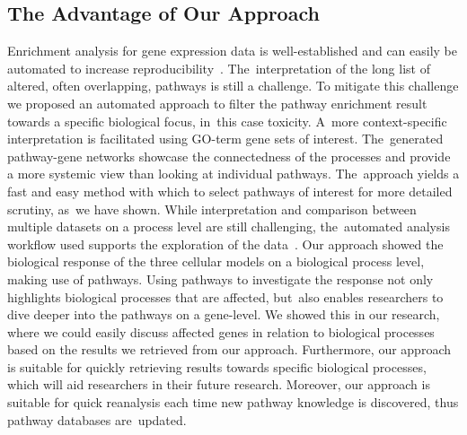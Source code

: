 \documentclass[ijms,article,accept,moreauthors,pdftex]{Definitions/mdpi}
\begin{document}
\begin{paracol}{2}
\subsection{The Advantage of Our Approach}
Enrichment analysis for gene expression data is well-established and can easily be automated to increase reproducibility~\cite{Yu2012}. The~interpretation of the long list of altered, often overlapping, pathways is still a challenge. {To mitigate this challenge we proposed} an automated approach to filter the pathway enrichment result towards a specific biological focus, in~this case toxicity. A~more context-specific interpretation is facilitated {using GO-term gene sets of interest}. The~generated pathway-gene networks showcase the connectedness of the processes and provide a more systemic view than looking at individual pathways. The~approach yields a fast and easy method with which to select pathways of interest for more detailed scrutiny, as~we have shown. While interpretation and comparison between multiple datasets on a process level are still challenging, the~automated analysis workflow used supports the exploration of the data~\cite{TiO2-scripts}. {Our approach showed the biological response of the three cellular models on a biological process level, making use of pathways. Using pathways to investigate the response not only highlights biological processes that are affected, but~also enables researchers to dive deeper into the pathways on a gene-level. We showed this in our research, where we could easily discuss affected genes in relation to biological processes based on the results we retrieved from our approach. Furthermore, our approach is suitable for quickly retrieving results towards specific biological processes, which will aid researchers in their future research. Moreover, our approach is suitable for quick reanalysis each time new pathway knowledge is discovered, thus pathway databases are~updated.}


\end{paracol}
\end{document}

